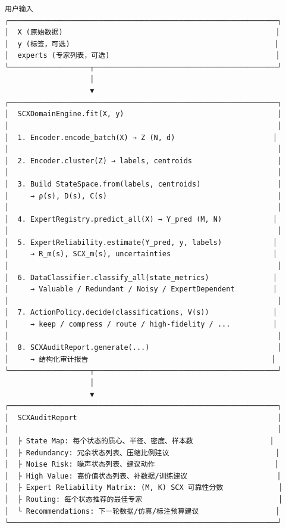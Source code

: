 \documentclass[
  12pt,
]{ctexart}
\begin{document}
\begin{verbatim}
用户输入
┌───────────────────────────────────────────────────────────────┐
│  X (原始数据)                                                  │
│  y (标签，可选)                                                │
│  experts (专家列表，可选)                                       │
└───────────────────┬───────────────────────────────────────────┘
                    │
                    ▼
┌───────────────────────────────────────────────────────────────┐
│  SCXDomainEngine.fit(X, y)                                    │
│                                                               │
│  1. Encoder.encode_batch(X) → Z (N, d)                       │
│                                                               │
│  2. Encoder.cluster(Z) → labels, centroids                    │
│                                                               │
│  3. Build StateSpace.from(labels, centroids)                  │
│     → ρ(s), D(s), C(s)                                        │
│                                                               │
│  4. ExpertRegistry.predict_all(X) → Y_pred (M, N)            │
│                                                               │
│  5. ExpertReliability.estimate(Y_pred, y, labels)            │
│     → R_m(s), SCX_m(s), uncertainties                        │
│                                                               │
│  6. DataClassifier.classify_all(state_metrics)               │
│     → Valuable / Redundant / Noisy / ExpertDependent         │
│                                                               │
│  7. ActionPolicy.decide(classifications, V(s))               │
│     → keep / compress / route / high-fidelity / ...          │
│                                                               │
│  8. SCXAuditReport.generate(...)                              │
│     → 结构化审计报告                                           │
└───────────────────┬───────────────────────────────────────────┘
                    │
                    ▼
┌───────────────────────────────────────────────────────────────┐
│  SCXAuditReport                                               │
│                                                               │
│  ├ State Map: 每个状态的质心、半径、密度、样本数                  │
│  ├ Redundancy: 冗余状态列表、压缩比例建议                         │
│  ├ Noise Risk: 噪声状态列表、建议动作                            │
│  ├ High Value: 高价值状态列表、补数据/训练建议                     │
│  ├ Expert Reliability Matrix: (M, K) SCX 可靠性分数             │
│  ├ Routing: 每个状态推荐的最佳专家                                │
│  └ Recommendations: 下一轮数据/仿真/标注预算建议                  │
└───────────────────────────────────────────────────────────────┘
\end{verbatim}
\end{document}
